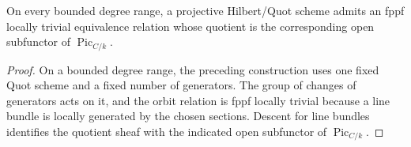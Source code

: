 \begin{lemma}
  \label{mk-lem-picard-quotient}
  \cite[Lem.~4.9]{kleiman-picard}
  On every bounded degree range, a projective Hilbert/Quot scheme admits an
  fppf locally trivial equivalence relation whose quotient is the
  corresponding open subfunctor of \(\operatorname{Pic}_{C/k}\).
\end{lemma}

\begin{proof}
  On a bounded degree range, the preceding construction uses one fixed
  Quot scheme and a fixed number of generators.  The group of changes of
  generators acts on it, and the orbit relation is fppf locally trivial
  because a line bundle is locally generated by the chosen sections.  Descent
  for line bundles identifies the quotient sheaf with the indicated open
  subfunctor of \(\operatorname{Pic}_{C/k}\).
\end{proof}
